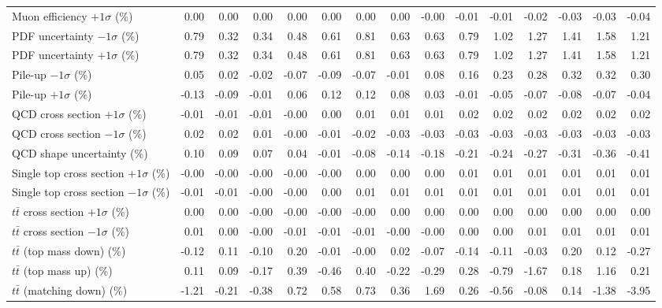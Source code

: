 \begin{table}[htbp]
{\begin{tabular}{lrrrrrrrrrrrrrr}
Muon efficiency $+1\sigma$ (\%) & 0.00 & 0.00 & 0.00 & 0.00 & 0.00 & 0.00 & 0.00 & -0.00 & -0.01 & -0.01 & -0.02 & -0.03 & -0.03 & -0.04 \\ 
PDF uncertainty $-1\sigma$ (\%) & 0.79 & 0.32 & 0.34 & 0.48 & 0.61 & 0.81 & 0.63 & 0.63 & 0.79 & 1.02 & 1.27 & 1.41 & 1.58 & 1.21 \\ 
PDF uncertainty $+1\sigma$ (\%) & 0.79 & 0.32 & 0.34 & 0.48 & 0.61 & 0.81 & 0.63 & 0.63 & 0.79 & 1.02 & 1.27 & 1.41 & 1.58 & 1.21 \\ 
Pile-up $-1\sigma$ (\%) & 0.05 & 0.02 & -0.02 & -0.07 & -0.09 & -0.07 & -0.01 & 0.08 & 0.16 & 0.23 & 0.28 & 0.32 & 0.32 & 0.30 \\ 
Pile-up $+1\sigma$ (\%) & -0.13 & -0.09 & -0.01 & 0.06 & 0.12 & 0.12 & 0.08 & 0.03 & -0.01 & -0.05 & -0.07 & -0.08 & -0.07 & -0.04 \\ 
QCD cross section \ensuremath{+1\sigma} (\%) & -0.01 & -0.01 & -0.01 & -0.00 & 0.00 & 0.01 & 0.01 & 0.01 & 0.02 & 0.02 & 0.02 & 0.02 & 0.02 & 0.02 \\ 
QCD cross section \ensuremath{-1\sigma} (\%) & 0.02 & 0.02 & 0.01 & -0.00 & -0.01 & -0.02 & -0.03 & -0.03 & -0.03 & -0.03 & -0.03 & -0.03 & -0.03 & -0.03 \\ 
QCD shape uncertainty (\%) & 0.10 & 0.09 & 0.07 & 0.04 & -0.01 & -0.08 & -0.14 & -0.18 & -0.21 & -0.24 & -0.27 & -0.31 & -0.36 & -0.41 \\ 
Single top cross section $+1\sigma$ (\%) & -0.00 & -0.00 & -0.00 & -0.00 & -0.00 & 0.00 & 0.00 & 0.00 & 0.01 & 0.01 & 0.01 & 0.01 & 0.01 & 0.01 \\ 
Single top cross section $-1\sigma$ (\%) & -0.01 & -0.01 & -0.00 & -0.00 & 0.00 & 0.01 & 0.01 & 0.01 & 0.01 & 0.01 & 0.01 & 0.01 & 0.01 & 0.01 \\ 
$t\bar{t}$ cross section $+1\sigma$ (\%) & 0.00 & 0.00 & -0.00 & -0.00 & -0.00 & -0.00 & 0.00 & 0.00 & 0.00 & 0.00 & 0.00 & 0.00 & 0.00 & 0.00 \\ 
$t\bar{t}$ cross section $-1\sigma$ (\%) & 0.01 & 0.00 & -0.00 & -0.01 & -0.01 & -0.01 & -0.00 & -0.00 & 0.00 & 0.00 & 0.01 & 0.01 & 0.01 & 0.01 \\ 
$t\bar{t}$ (top mass down) (\%) & -0.12 & 0.11 & -0.10 & 0.20 & -0.01 & -0.00 & 0.02 & -0.07 & -0.14 & -0.11 & -0.03 & 0.20 & 0.12 & -0.27 \\ 
$t\bar{t}$ (top mass up) (\%) & 0.11 & 0.09 & -0.17 & 0.39 & -0.46 & 0.40 & -0.22 & -0.29 & 0.28 & -0.79 & -1.67 & 0.18 & 1.16 & 0.21 \\ 
$t\bar{t}$ (matching down) (\%) & -1.21 & -0.21 & -0.38 & 0.72 & 0.58 & 0.73 & 0.36 & 1.69 & 0.26 & -0.56 & -0.08 & 0.14 & -1.38 & -3.95 \\ 

\end{tabular}}
\end{table}
